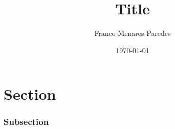 \documentclass[twocolumn,a4paper]{article}
\title{Title}
\author{Franco Menares-Paredes}
\date{\today}
\theoremstyle{definition}
\begin{document}
\maketitle

\section{Section}

\subsubsection*{Subsection}




\end{document}
